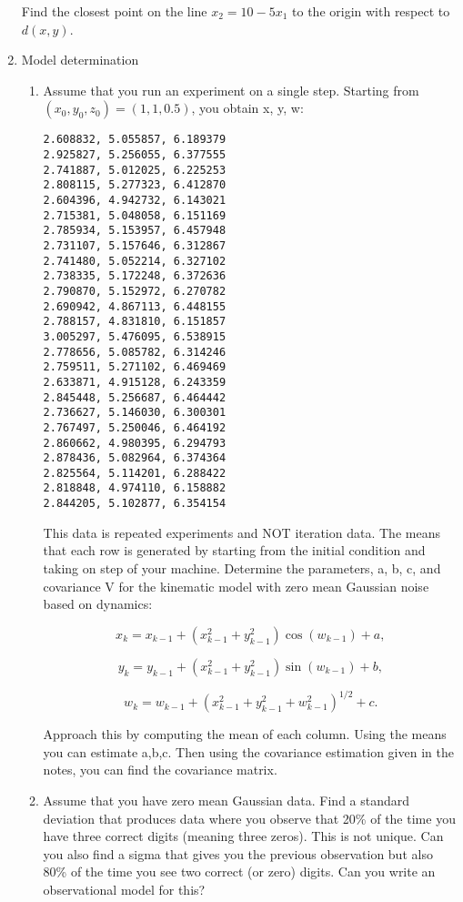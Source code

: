 \begin{enumerate}
  Find the closest point on the line \(x_2 = 10 - 5x_1\) to the origin
  with respect to \(d(x,y)\).
\item
  Model determination

  \begin{enumerate}
  \item
    Assume that you run an experiment on a single step. Starting from
    \((x_0, y_0, z_0) = (1, 1, 0.5)\), you obtain x, y, w:

\begin{verbatim}
2.608832, 5.055857, 6.189379
2.925827, 5.256055, 6.377555
2.741887, 5.012025, 6.225253
2.808115, 5.277323, 6.412870
2.604396, 4.942732, 6.143021
2.715381, 5.048058, 6.151169
2.785934, 5.153957, 6.457948
2.731107, 5.157646, 6.312867
2.741480, 5.052214, 6.327102
2.738335, 5.172248, 6.372636
2.790870, 5.152972, 6.270782
2.690942, 4.867113, 6.448155
2.788157, 4.831810, 6.151857
3.005297, 5.476095, 6.538915
2.778656, 5.085782, 6.314246
2.759511, 5.271102, 6.469469
2.633871, 4.915128, 6.243359
2.845448, 5.256687, 6.464442
2.736627, 5.146030, 6.300301
2.767497, 5.250046, 6.464192
2.860662, 4.980395, 6.294793
2.878436, 5.082964, 6.374364
2.825564, 5.114201, 6.288422
2.818848, 4.974110, 6.158882
2.844205, 5.102877, 6.354154
\end{verbatim}

    This data is repeated experiments and NOT iteration data. The means
    that each row is generated by starting from the initial condition
    and taking on step of your machine. Determine the parameters, a, b,
    c, and covariance V for the kinematic model with zero mean Gaussian
    noise based on dynamics:

    \[x_k = x_{k-1} + (x_{k-1}^2 + y_{k-1}^2)\cos(w_{k-1}) +a,\]

    \[y_k = y_{k-1} + (x_{k-1}^2 + y_{k-1}^2)\sin(w_{k-1})+b ,\]

    \[w_k = w_{k-1} + (x_{k-1}^2 + y_{k-1}^2 + w_{k-1}^2)^{1/2}+c.\]

    Approach this by computing the mean of each column. Using the means
    you can estimate a,b,c. Then using the covariance estimation given
    in the notes, you can find the covariance matrix.
  \item
    Assume that you have zero mean Gaussian data. Find a standard
    deviation that produces data where you observe that 20\% of the time
    you have three correct digits (meaning three zeros). This is not
    unique. Can you also find a sigma that gives you the previous
    observation but also 80\% of the time you see two correct (or zero)
    digits. Can you write an observational model for this?
  \end{enumerate}
\end{enumerate}


